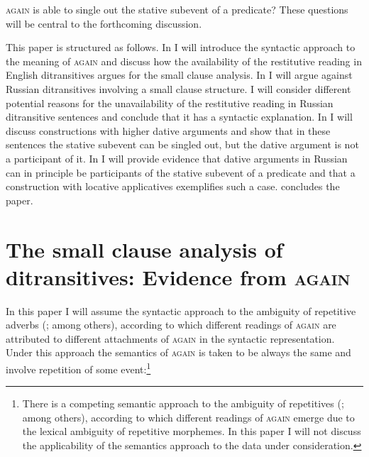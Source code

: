\documentclass[output=paper]{langscibook}
\begin{document}
 \textsc{again}{ is able to single out the stative subevent of a predicate? These questions will be central to the forthcoming discussion.}



This paper is structured as follows. In  I will introduce the syntactic approach to the meaning of \textsc{again} and discuss how the availability of the restitutive reading in English ditransitives argues for the small clause analysis. In  I will argue against Russian ditransitives involving a small clause structure. I will consider different potential reasons for the unavailability of the restitutive reading in Russian ditransitive sentences and conclude that it has a syntactic explanation. In  I will discuss constructions with higher dative arguments and show that in these sentences the stative subevent can be singled out, but the dative argument is not a participant of it. In  I will provide evidence that dative arguments in Russian can in principle be participants of the stative subevent of a predicate and that a construction with locative applicatives exemplifies such a case.  concludes the paper.


\section{The small clause analysis of ditransitives: Evidence from \textsc{again}}\label{s2}

In this paper I will assume the syntactic approach to the ambiguity of repetitive adverbs (\citealt{vonStechow1996,Beck-Johnson2004,Beck2005,Alexiadou-etal2014,Lechner-etal2015}; among others), according to which different readings of \textsc{again} are attributed to different attachments of \textsc{again} in the syntactic representation. Under this approach the semantics of \textsc{again} is taken to be always the same and involve repetition of some event:\footnote{There is a competing semantic approach to the ambiguity of repetitives (\citealt{FabriciusHansen2001,Jäger-Blutner2000}; among others), according to which different readings of \textsc{again} emerge due to the lexical ambiguity of repetitive morphemes. In this paper I will not discuss the applicability of the semantics approach to the data under consideration.}
\end{document}
